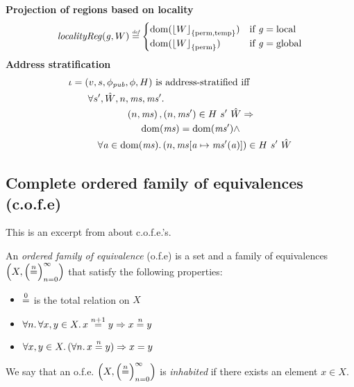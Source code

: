 \documentclass[format=acmsmall, review=true, screen=true]{acmart}
\DeclarePairedDelimiter\floor{\lfloor}{\rfloor}
\newcommand{\update}[2]{[#1 \mapsto #2]}
\newcommand{\defeq}{\stackrel{\textit{\tiny{def}}}{=}}
\newcommand{\nequal}[1][n]{\stackrel{\tiny{#1}}{=}}
\DeclareMathOperator{\dom}{dom}
\newcommand{\var}[1]{\mathit{#1}}
\newcommand{\hs}{\var{ms}}
\newcommand{\ms}{\hs}
\newcommand{\gl}{\var{g}}
\newcommand{\addr}{\var{a}}
\newcommand{\erase}[2]{\floor*{#1}_{\{#2\}}}
\newcommand{\pub}{\var{pub}}
\newcommand{\npair}[2][n]{\left(#1,#2 \right)}
\newcommand{\plainlocality}[1]{\mathrm{#1}}
\newcommand{\local}{\plainlocality{local}}
\newcommand{\glob}{\plainlocality{global}}
\newcommand{\localityReg}{\var{localityReg}}
\newcommand{\plainview}[1]{\mathrm{#1}}
\newcommand{\perma}{\plainview{perm}}
\newcommand{\temp}{\plainview{temp}}
\begin{document}
%
\textbf{Projection of regions based on locality}
\[
  \localityReg(\gl,W) \defeq 
  \begin{cases}
    \dom(\erase{W}{\perma ,\temp}) & \text{if } \gl = \local \\
    \dom(\erase{W}{\perma}) & \text{if } \gl = \glob
  \end{cases}
\]
%
\textbf{Address stratification}
\begin{align*}
&\iota = (v,s,\phi_\pub,\phi,H) \text{ is address-stratified iff }\\
&\qquad\begin{multlined}
  \forall s', \hat{W}, n, \ms, \ms' \ldotp \\
  \npair{\ms},\npair{\ms'} \in H~ s'~ \hat{W} \Rightarrow \\
  \dom(\ms) = \dom(\ms') \wedge \\
  \forall \addr \in
  \dom(\ms)\ldotp \npair{\ms\update{\addr}{\ms'(\addr)}} \in H~ s'~ \hat{W}
\end{multlined}
\end{align*}


\subsection{Complete ordered family of equivalences (c.o.f.e)}
\newcommand{\seq}[1]{\ensuremath{\left\{#1_n\right\}_{n=0}^{\infty}}}
\newcommand{\seqn}[1]{\ensuremath{\left(#1\right)_{n=0}^{\infty}}}
\newcommand{\NN}{\ensuremath{\mathbb{N}}}
\newcommand{\Ul}{\ensuremath{\mathcal{U}}}
\newcommand{\Later}{\ensuremath{\blacktriangleright}}
\newcommand{\op}[1]{\ensuremath{#1^{\text{op}}}}
\newcommand{\comp}{\circ}
\newcommand{\iso}{\cong}
\renewcommand{\hom}[3]{#1(#2,#3)}

\label{app:cofe}
This is an excerpt from \citet{Birkedal:tutorial-notes} about c.o.f.e.'s.
\begin{definition}[o.f.e.] An \emph{ordered family of equivalence} (o.f.e) is a
  set and a family of equivalences $\left(X, \left( \nequal \right)_{n=0}^\infty
  \right)$ that satisfy the following properties: 
  \begin{itemize}
  \item $\nequal[0]$ is the total relation on $X$
  \item $\forall n \ldotp \forall x,y \in X \ldotp x \nequal[n+1] y \Rightarrow
    x \nequal y$
  \item $\forall x,y \in X \ldotp (\forall n\ldotp x \nequal y) \Rightarrow x = y$
  \end{itemize}
  We say that an o.f.e. $\left(X, \seqn{\nequal[n]}\right)$ is \emph{inhabited} if there
  exists an element $x \in X$.
\end{definition}
\end{document}
